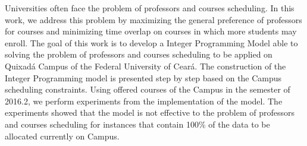 Universities often face the problem of professors and courses scheduling. In this work, we address this problem by maximizing the general preference of professors for courses and minimizing time overlap on courses in which more students may enroll. The goal of this work is to develop a Integer Programming Model able to solving the problem of professors and courses scheduling to be applied on Quixadá Campus of the Federal University of Ceará. The construction of the Integer Programming model is presented step by step based on the Campus scheduling constraints. Using offered courses of the Campus in the semester of 2016.2, we perform experiments from the implementation of the model. The experiments showed that the model is not effective to the problem of professors and courses scheduling for instances that contain 100\% of the data to be allocated currently on Campus.

